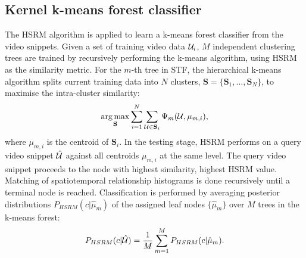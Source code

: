 \subsection{Kernel k-means forest classifier}
\label{sec/act/kmeansforest}
The HSRM algorithm is applied to learn a k-means forest classifier from the video snippets. Given a set of training video data $\mathcal{U}_i$, $M$ independent clustering trees are trained by recursively performing the k-means algorithm, using HSRM as the similarity metric. 
For the $m$-th tree in STF, the hierarchical k-means algorithm splits current training data into $N$ clusters, $\mathbf{S} = \{\mathbf{S}_1,\dots,\mathbf{S}_N\}$, to maximise the intra-cluster similarity:
\begin{equation}
	\displaystyle\operatorname*{arg\,max}_{\mathbf{S}} \displaystyle\sum_{i = 1}^{N}\sum_{\mathcal{U} \in \mathbf{S}_{i}} \Psi_m(\mathcal{U}, \mu_{m,i}),
	\label{eqn/act/kmeans}
\end{equation}
where $\mu_{m,i}$ is the centroid of $\mathbf{S}_i$. In the testing stage, HSRM performs on a query video snippet $\mathcal{\hat{U}}$ against all centroids $\mu_{m,i}$ at the same level. The query video snippet proceeds to the node with highest similarity, \ie highest HSRM value. Matching of spatiotemporal relationship histograms is done recursively until a terminal node is reached. Classification is performed by averaging posterior distributions $P_{HSRM}(c|\hat{\mu}_{m})$ of the assigned leaf nodes $\{ \hat{\mu}_m \}$ over $M$ trees in the k-means forest: 
\begin{equation}
	P_{HSRM}(c|\mathcal{\hat{U}}) = 
	\frac{1}{M}\displaystyle\sum_{m=1}^{M}P_{HSRM}(c|\hat{\mu}_{m}).
	\label{eqn/act/kmeansforest}
\end{equation}


